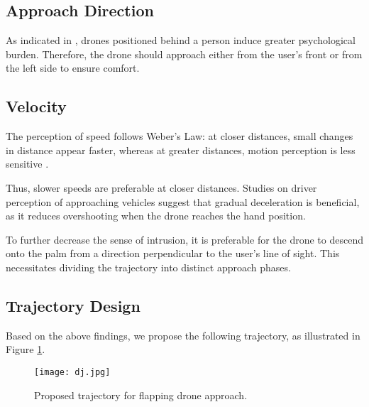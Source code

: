 \subsection{Approach Direction}

As indicated in \cite{lieser2021evaluating-distances}, drones positioned behind a person induce greater psychological burden. Therefore, the drone should approach either from the user's front or from the left side to ensure comfort.

\subsection{Velocity}

The perception of speed follows Weber's Law: at closer distances, small changes in distance appear faster, whereas at greater distances, motion perception is less sensitive \cite{weber_law}.

Thus, slower speeds are preferable at closer distances. Studies on driver perception of approaching vehicles \cite{jsaeronbun_42_2_619} suggest that gradual deceleration is beneficial, as it reduces overshooting when the drone reaches the hand position.

To further decrease the sense of intrusion, it is preferable for the drone to descend onto the palm from a direction perpendicular to the user's line of sight. This necessitates dividing the trajectory into distinct approach phases.

\subsection{Trajectory Design}

Based on the above findings, we propose the following trajectory, as illustrated in Figure \ref{fig:trajectory}.

\begin{figure}[t]
    \centering
    \texttt{[image: dj.jpg]}
    \caption{Proposed trajectory for flapping drone approach.}
    \label{fig:trajectory}
\end{figure}


